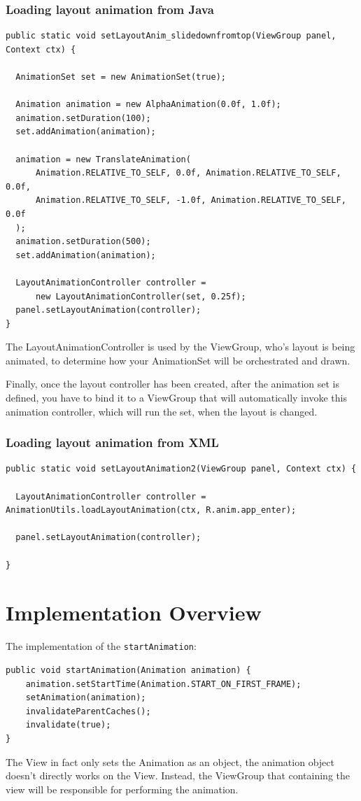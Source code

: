 \documentclass[11pt, a4paper]{book}
\begin{document}
\subsubsection{Loading layout animation from Java}
\begin{verbatim}
public static void setLayoutAnim_slidedownfromtop(ViewGroup panel, Context ctx) {

  AnimationSet set = new AnimationSet(true);

  Animation animation = new AlphaAnimation(0.0f, 1.0f);
  animation.setDuration(100);
  set.addAnimation(animation);

  animation = new TranslateAnimation(
      Animation.RELATIVE_TO_SELF, 0.0f, Animation.RELATIVE_TO_SELF, 0.0f,
      Animation.RELATIVE_TO_SELF, -1.0f, Animation.RELATIVE_TO_SELF, 0.0f
  );
  animation.setDuration(500);
  set.addAnimation(animation);

  LayoutAnimationController controller =
      new LayoutAnimationController(set, 0.25f);
  panel.setLayoutAnimation(controller);
}
\end{verbatim}
The LayoutAnimationController is used by the ViewGroup, who's layout is being
animated, to determine how your AnimationSet will be orchestrated and drawn.

Finally, once the layout controller has been created, after the animation set is
defined, you have to bind it to a ViewGroup that will automatically invoke this
animation controller, which will run the set, when the layout is changed.

\subsubsection{Loading layout animation from XML}
\begin{verbatim}
public static void setLayoutAnimation2(ViewGroup panel, Context ctx) {

  LayoutAnimationController controller = AnimationUtils.loadLayoutAnimation(ctx, R.anim.app_enter);

  panel.setLayoutAnimation(controller);

}
\end{verbatim}
\section{Implementation Overview}
The implementation of the \verb|startAnimation|:
\begin{verbatim}
public void startAnimation(Animation animation) {
    animation.setStartTime(Animation.START_ON_FIRST_FRAME);
    setAnimation(animation);
    invalidateParentCaches();
    invalidate(true);
}
\end{verbatim}
The View in fact only sets the Animation as an object, the animation object
doesn't directly works on the View. Instead, the ViewGroup that containing the
view will be responsible for performing the animation.
\end{document}
